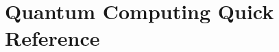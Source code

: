 \documentclass{report}
\begin{document}
\chapter{Quantum Computing Quick Reference}



\begin{appendices}\label{sec:Appendix}
  \printindex
\end{appendices}

\end{document}
